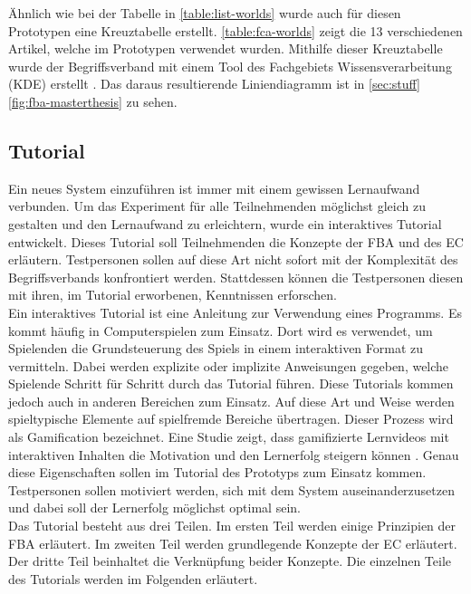 Ähnlich wie bei der Tabelle in \autoref{table:list-worlds} wurde auch für diesen Prototypen eine Kreuztabelle erstellt.
\autoref{table:fca-worlds} zeigt die 13 verschiedenen Artikel, welche im Prototypen verwendet wurden.
Mithilfe dieser Kreuztabelle wurde der Begriffsverband mit einem Tool des Fachgebiets Wissensverarbeitung (KDE) erstellt \cite{conexp-clj}.
Das daraus resultierende Liniendiagramm ist in \autoref{sec:stuff} \autoref{fig:fba-masterthesis} zu sehen.

\subsection{Tutorial}
Ein neues System einzuführen ist immer mit einem gewissen Lernaufwand verbunden.
Um das Experiment für alle Teilnehmenden möglichst gleich zu gestalten und den Lernaufwand zu erleichtern, wurde ein interaktives Tutorial entwickelt.
Dieses Tutorial soll Teilnehmenden die Konzepte der \ac{FBA} und des \ac{EC} erläutern.
Testpersonen sollen auf diese Art nicht sofort mit der Komplexität des Begriffsverbands konfrontiert werden.
Stattdessen können die Testpersonen diesen mit ihren, im Tutorial erworbenen, Kenntnissen erforschen.\\

Ein interaktives Tutorial ist eine Anleitung zur Verwendung eines Programms.
Es kommt häufig in Computerspielen zum Einsatz.
Dort wird es verwendet, um Spielenden die Grundsteuerung des Spiels in einem interaktiven Format zu vermitteln.
Dabei werden explizite oder implizite Anweisungen gegeben, welche Spielende Schritt für Schritt durch das Tutorial führen.
Diese Tutorials kommen jedoch auch in anderen Bereichen zum Einsatz.
Auf diese Art und Weise werden spieltypische Elemente auf spielfremde Bereiche übertragen.
Dieser Prozess wird als Gamification bezeichnet.
Eine Studie zeigt, dass gamifizierte Lernvideos mit interaktiven Inhalten die Motivation und den Lernerfolg steigern können \cite{gamification-videos}.
Genau diese Eigenschaften sollen im Tutorial des Prototyps zum Einsatz kommen.
Testpersonen sollen motiviert werden, sich mit dem System auseinanderzusetzen und dabei soll der Lernerfolg möglichst optimal sein.\\

Das Tutorial besteht aus drei Teilen.
Im ersten Teil werden einige Prinzipien der \ac{FBA} erläutert.
Im zweiten Teil werden grundlegende Konzepte der \ac{EC} erläutert.
Der dritte Teil beinhaltet die Verknüpfung beider Konzepte.
Die einzelnen Teile des Tutorials werden im Folgenden erläutert.\\

